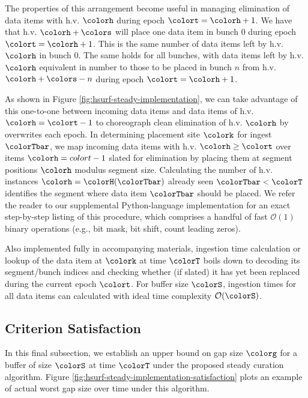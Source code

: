 The properties of this arrangement become useful in managing elimination of data items with h.v. $\colorh$ during epoch $\colort=\colorh + 1$.
We have that h.v. $\colorh + \colors$ will place one data item in bunch 0 during epoch $\colort=\colorh + 1$.
This is the same number of data items left by h.v. $\colorh$ in bunch 0.
The same holds for all bunches, with data items left by h.v. $\colorh$ equivalent in number to those to be placed in bunch $n$ from h.v. $\colorh + \colors - n$ during epoch $\colort = \colorh + 1$.

As shown in Figure \ref{fig:hsurf-steady-implementation}, we can take advantage of this one-to-one between incoming data items and data items of h.v. $\colorh=\colort-1$ to choreograph clean elimination of h.v. $\colorh$ by overwrites each epoch.
In determining placement site $\colork$ for ingest $\colorTbar$, we map incoming data items with h.v. $\colorh \geq \colort$ over items $\colorh = colort - 1$ slated for elimination by placing them at segment positions $\colorh$ modulus segment size.
Calculating the number of h.v. instances $\colorh = \colorH(\colorTbar)$ already seen $\colorTbar < \colorT$ identifies the segment where data item $\colorTbar$ should be placed.
We refer the reader to our supplemental Python-language implementation for an exact step-by-step listing of this procedure, which comprises a handful of fast $\mathcal{O}(1)$ binary operations (e.g., bit mask, bit shift, count leading zeros).



Also implemented fully in accompanying materials, ingestion time calculation or lookup of the data item at $\colork$ at time $\colorT$ boils down to decoding its segment/bunch indices and checking whether (if slated) it has yet been replaced during the current epoch $\colort$.
For buffer size $\colorS$, ingestion times for all data items can calculated with ideal time complexity $\mathcal{O}(\colorS)$.

\subsection{Criterion Satisfaction}

In this final subsection, we establish an upper bound on gap size $\colorg$ for a buffer of size $\colorS$ at time $\colorT$ under the proposed steady curation algorithm.
Figure \ref{fig:hsurf-steady-implementation-satisfaction} plots an example of actual worst gap size over time under this algorithm.


